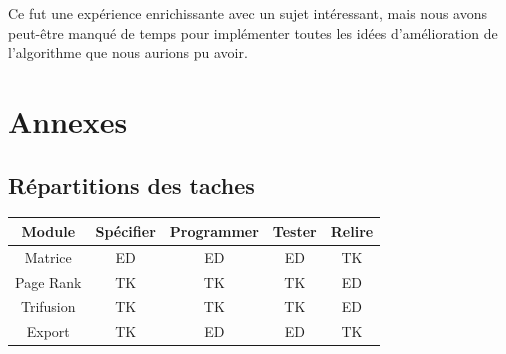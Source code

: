 \documentclass{NewTeX}
\begin{document}
Ce fut une expérience enrichissante avec un sujet intéressant, mais nous avons peut-être manqué de temps pour implémenter toutes les idées d'amélioration de l'algorithme que nous aurions pu avoir.



\section{Annexes}

\subsection{Répartitions des taches}
\begin{table}[H]
    \centering
    \begin{tabular}{|c||c|c|c|c|}
        \hline
        Module & Spécifier & Programmer & Tester & Relire \\
        \hline
        \hline
        Matrice & ED & ED & ED & TK \\
        \hline
        Page Rank & TK & TK & TK & ED \\
        \hline
        Trifusion & TK & TK & TK & ED \\
        \hline
        Export & TK & ED & ED & TK \\
        \hline
     \end{tabular} 
\end{table}
\end{document}
